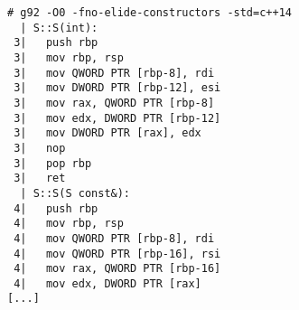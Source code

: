 \begin{lstlisting}[language={},numbers=none,title=\href{https://godbolt.org/z/LY5mZK}{\texttt{godbolt.org/z/LY5mZK}}]
# g92 -O0 -fno-elide-constructors -std=c++14
  | S::S(int):
 3|   push rbp
 3|   mov rbp, rsp
 3|   mov QWORD PTR [rbp-8], rdi
 3|   mov DWORD PTR [rbp-12], esi
 3|   mov rax, QWORD PTR [rbp-8]
 3|   mov edx, DWORD PTR [rbp-12]
 3|   mov DWORD PTR [rax], edx
 3|   nop
 3|   pop rbp
 3|   ret
  | S::S(S const&):
 4|   push rbp
 4|   mov rbp, rsp
 4|   mov QWORD PTR [rbp-8], rdi
 4|   mov QWORD PTR [rbp-16], rsi
 4|   mov rax, QWORD PTR [rbp-16]
 4|   mov edx, DWORD PTR [rax]
[...]
\end{lstlisting}
